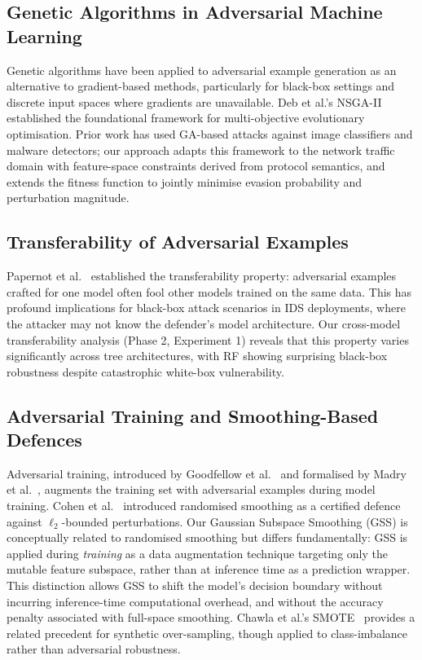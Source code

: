 \documentclass[review,12pt]{elsarticle}
\begin{document}
\subsection{Genetic Algorithms in Adversarial Machine Learning}
Genetic algorithms have been applied to adversarial example generation as an alternative to gradient-based methods, particularly for black-box settings and discrete input spaces where gradients are unavailable. Deb et al.'s NSGA-II~\cite{deb2002nsga} established the foundational framework for multi-objective evolutionary optimisation. Prior work has used GA-based attacks against image classifiers and malware detectors; our approach adapts this framework to the network traffic domain with feature-space constraints derived from protocol semantics, and extends the fitness function to jointly minimise evasion probability and perturbation magnitude.

\subsection{Transferability of Adversarial Examples}
Papernot et al.~\cite{papernot2016transferability} established the transferability property: adversarial examples crafted for one model often fool other models trained on the same data. This has profound implications for black-box attack scenarios in IDS deployments, where the attacker may not know the defender's model architecture. Our cross-model transferability analysis (Phase 2, Experiment 1) reveals that this property varies significantly across tree architectures, with RF showing surprising black-box robustness despite catastrophic white-box vulnerability.

\subsection{Adversarial Training and Smoothing-Based Defences}
Adversarial training, introduced by Goodfellow et al.~\cite{goodfellow2014explaining} and formalised by Madry et al.~\cite{madry2018towards}, augments the training set with adversarial examples during model training. Cohen et al.~\cite{cohen2019certified} introduced randomised smoothing as a certified defence against $\ell_2$-bounded perturbations. Our Gaussian Subspace Smoothing (GSS) is conceptually related to randomised smoothing but differs fundamentally: GSS is applied during \emph{training} as a data augmentation technique targeting only the mutable feature subspace, rather than at inference time as a prediction wrapper. This distinction allows GSS to shift the model's decision boundary without incurring inference-time computational overhead, and without the accuracy penalty associated with full-space smoothing. Chawla et al.'s SMOTE~\cite{chawla2002smote} provides a related precedent for synthetic over-sampling, though applied to class-imbalance rather than adversarial robustness.
\end{document}
